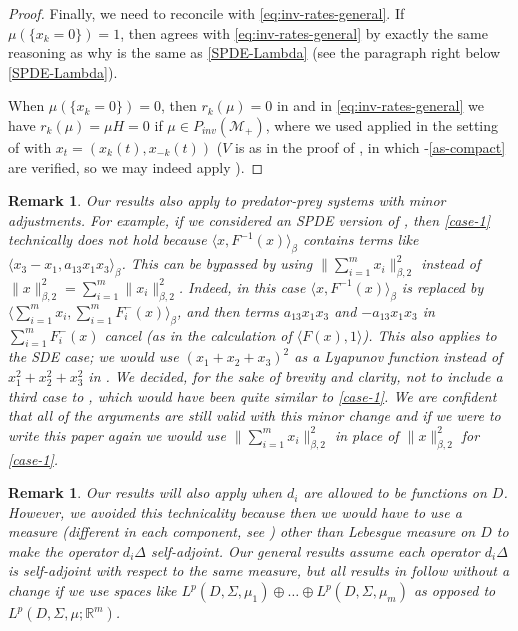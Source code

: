 \documentclass[final]{amsart}
\newtheorem{rem}[thm]{Remark}
\numberwithin{thm}{section}
\numberwithin{equation}{section}
\newcommand{\R}{\mathbb{R}}
\newcommand{\inv}{\mathcal{M}_+}
\newcommand{\ip}[2]{\langle #1, #2 \rangle}
\begin{document}
\begin{proof}
Finally, we need to reconcile  with \eqref{eq:inv-rates-general}. If $\mu(\{x_k = 0\}) = 1$, then   agrees with \eqref{eq:inv-rates-general} by exactly the same reasoning as why  is the same as \eqref{SPDE-Lambda} (see the paragraph right below \eqref{SPDE-Lambda}). 

When $\mu(\{x_k = 0\}) = 0$, then $r_k(\mu) = 0$ in  and 
in \eqref{eq:inv-rates-general} we have 
$r_k(\mu) = \mu H = 0$ if $\mu \in P_{inv}(\inv)$, where we used  applied in the setting of  with $x_t = (x_k(t),x_{-k}(t))$ ($V$ is as in the proof of , in which -\ref{as-compact} are verified, so we may indeed apply ).
    
\end{proof}


\begin{rem}
     Our results also apply to predator-prey systems with minor adjustments. For example, if we considered an SPDE version of \cite[(5.20)]{ecologicalGeneral}, then \ref{case-1} technically does not hold because $\ip{x}{F^{-1}(x)}_\beta$ contains terms like $\ip{x_3-x_1}{a_{13}x_1x_3}_\beta$. This can be bypassed by using $\|\sum_{i=1}^m x_i\|_{\beta,2}^2$ instead of $\|x\|_{\beta,2}^2 = \sum_{i=1}^m \|x_i\|_{\beta,2}^2$. Indeed, in this case $\ip{x}{F^{-1}(x)}_\beta$ is replaced by $\ip{\sum_{i=1}^m x_i}{\sum_{i=1}^m F_i^-(x)}_\beta$, and then terms $a_{13}x_1x_3$ and $-a_{13}x_1x_3$ in $\sum_{i=1}^m F_i^-(x)$ cancel (as in the calculation of $\ip{F(x)}{1}$). This also applies to the SDE case; we would 
     use $(x_1+x_2+x_3)^2$ as 
     a Lyapunov function instead of $x_1^2+x_2^2+x_3^2$ in \cite[(5.20)]{ecologicalGeneral}. We decided, for the sake of brevity and clarity, not to include a third case to , which would have been quite similar to \ref{case-1}. We are confident that all of the arguments are still valid with this minor change and if we were to write this paper again we would use $\|\sum_{i=1}^m x_i\|_{\beta,2}^2$ in place of $\|x\|_{\beta,2}^2$ for \ref{case-1}. 
\end{rem}

\begin{rem}
    Our results will also apply when $d_i$ are allowed to be functions on $D$. However, we avoided this technicality because then we would have to use a measure (different in each component, see ) other than Lebesgue measure on $D$ to make the operator $d_i\Delta$ self-adjoint. Our general results assume each operator $d_i\Delta$ is self-adjoint with respect to the same measure, but all results in  follow without a change if we use spaces like $L^p(D,\Sigma,\mu_1) \oplus \dots \oplus L^p(D,\Sigma,\mu_m)$ as opposed to $L^p(D,\Sigma,\mu;\R^m)$.
\end{rem}
\end{document}
